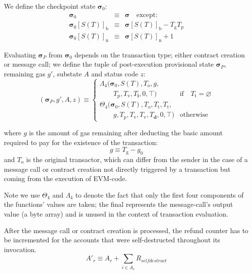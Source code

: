 \documentclass[9pt,oneside]{amsart}
\begin{document}
\begin{multicols}{2}
We define the checkpoint state $\boldsymbol{\sigma}_0$:
\begin{eqnarray}
\boldsymbol{\sigma}_0 & \equiv & \boldsymbol{\sigma} \quad \text{except:} \\
\boldsymbol{\sigma}_0[S(T)]_{\mathrm{b}} & \equiv & \boldsymbol{\sigma}[S(T)]_{\mathrm{b}} - T_{\mathrm{g}} T_{\mathrm{p}} \\
\boldsymbol{\sigma}_0[S(T)]_{\mathrm{n}} & \equiv & \boldsymbol{\sigma}[S(T)]_{\mathrm{n}} + 1
\end{eqnarray}

Evaluating $\boldsymbol{\sigma}_{P}$ from $\boldsymbol{\sigma}_0$ depends on the transaction type; either contract creation or message call; we define the tuple of post-execution provisional state $\boldsymbol{\sigma}_{P}$, remaining gas $g'$, substate $A$ and status code $z$:
\begin{equation}
(\boldsymbol{\sigma}_{P}, g', A, z) \equiv \begin{cases}
\Lambda_{4}(\boldsymbol{\sigma}_0, S(T), T_{\mathrm{o}}, g, &\\ \quad\quad T_{\mathrm{p}}, T_{\mathrm{v}}, T_{\mathbf{i}}, 0, \top) & \text{if} \quad T_{\mathrm{t}} = \varnothing \\
\Theta_{4}(\boldsymbol{\sigma}_0, S(T), T_{\mathrm{o}}, T_{\mathrm{t}}, T_{\mathrm{t}}, &\\ \quad\quad g, T_{\mathrm{p}}, T_{\mathrm{v}}, T_{\mathrm{v}}, T_{\mathbf{d}}, 0, \top) & \text{otherwise}
\end{cases}
\end{equation}

where $g$ is the amount of gas remaining after deducting the basic amount required to pay for the existence of the transaction:
\begin{equation}
g \equiv T_{\mathrm{g}} - g_0
\end{equation}
and $T_{\mathrm{o}}$ is the original transactor, which can differ from the sender in the case of a message call or contract creation not directly triggered by a transaction but coming from the execution of EVM-code.

Note we use $\Theta_{4}$ and $\Lambda_{4}$ to denote the fact that only the first four components of the functions' values are taken; the final represents the message-call's output value (a byte array) and is unused in the context of transaction evaluation.

After the message call or contract creation is processed, the refund counter has to be incremented for the accounts that were self-destructed throughout its invocation.
\begin{equation}
	A'_{r} \equiv A_{r} + \sum_{i \in A_{s}} R_{selfdestruct}
\end{equation}


\end{multicols}
\end{document}
